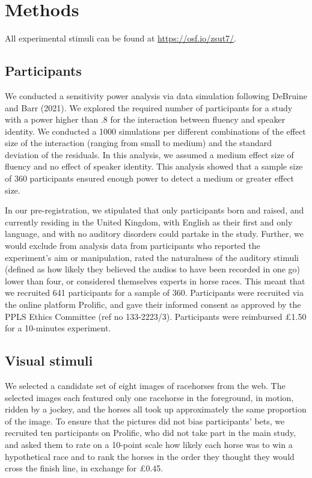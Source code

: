 \documentclass[
  man,floatsintext]{apa7}
\begin{document}
\hypertarget{methods}{%
\section{Methods}\label{methods}}

All experimental stimuli can be found at \url{https://osf.io/zsut7/}.

\hypertarget{participants}{%
\subsection{Participants}\label{participants}}

We conducted a sensitivity power analysis via data simulation following DeBruine and Barr (2021). We explored the required number of participants for a study with a power higher than .8 for the interaction between fluency and speaker identity. We conducted a 1000 simulations per different combinations of the effect size of the interaction (ranging from small to medium) and the standard deviation of the residuals. In this analysis, we assumed a medium effect size of fluency and no effect of speaker identity. This analysis showed that a sample size of 360 participants ensured enough power to detect a medium or greater effect size.

In our pre-registration, we stipulated that only participants born and raised, and currently residing in the United Kingdom, with English as their first and only language, and with no auditory disorders could partake in the study. Further, we would exclude from analysis data from participants who reported the experiment's aim or manipulation, rated the naturalness of the auditory stimuli (defined as how likely they believed the audios to have been recorded in one go) lower than four, or considered themselves experts in horse races. This meant that we recruited 641 participants for a sample of 360. Participants were recruited via the online platform Prolific, and gave their informed consent as approved by the PPLS Ethics Committee (ref no 133-2223/3). Participants were reimbursed £1.50 for a 10-minutes experiment.

\hypertarget{visual-stimuli}{%
\subsection{Visual stimuli}\label{visual-stimuli}}

We selected a candidate set of eight images of racehorses from the web. The selected images each featured only one racehorse in the foreground, in motion, ridden by a jockey, and the horses all took up approximately the same proportion of the image. To ensure that the pictures did not bias participants' bets, we recruited ten participants on Prolific, who did not take part in the main study, and asked them to rate on a 10-point scale how likely each horse was to win a hypothetical race and to rank the horses in the order they thought they would cross the finish line, in exchange for £0.45.
\end{document}
